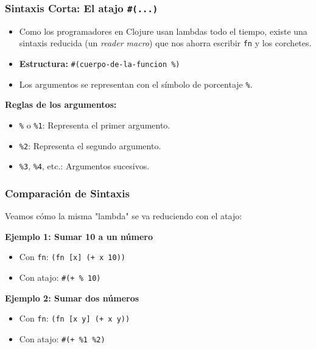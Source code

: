 \documentclass{beamer}
\begin{document}
\begin{frame}[fragile]
\frametitle{Sintaxis Corta: El atajo \texttt{\#(...)}}
\begin{itemize}
    \item Como los programadores en Clojure usan lambdas todo el tiempo, existe una sintaxis reducida (un \textit{reader macro}) que nos ahorra escribir \texttt{fn} y los corchetes.
    \item \textbf{Estructura:} \texttt{\#(cuerpo-de-la-funcion \%)}
    \item Los argumentos se representan con el símbolo de porcentaje \texttt{\%}.
\end{itemize}
\vspace{0.3cm}
\textbf{Reglas de los argumentos:}
\begin{itemize}
    \item \texttt{\%} o \texttt{\%1}: Representa el primer argumento.
    \item \texttt{\%2}: Representa el segundo argumento.
    \item \texttt{\%3}, \texttt{\%4}, etc.: Argumentos sucesivos.
\end{itemize}
\end{frame}

\begin{frame}[fragile]
\frametitle{Comparación de Sintaxis}
Veamos cómo la misma "lambda" se va reduciendo con el atajo:

\vspace{0.5cm}
\textbf{Ejemplo 1: Sumar 10 a un número}
\begin{itemize}
    \item Con \texttt{fn}: \texttt{(fn [x] (+ x 10))}
    \item Con atajo: \texttt{\#(+ \% 10)}
\end{itemize}

\vspace{0.5cm}
\textbf{Ejemplo 2: Sumar dos números}
\begin{itemize}
    \item Con \texttt{fn}: \texttt{(fn [x y] (+ x y))}
    \item Con atajo: \texttt{\#(+ \%1 \%2)}
\end{itemize}
\end{frame}
\end{document}
